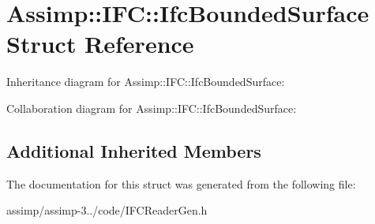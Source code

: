 \hypertarget{struct_assimp_1_1_i_f_c_1_1_ifc_bounded_surface}{\section{Assimp\+:\+:I\+F\+C\+:\+:Ifc\+Bounded\+Surface Struct Reference}
\label{struct_assimp_1_1_i_f_c_1_1_ifc_bounded_surface}
}


Inheritance diagram for Assimp\+:\+:I\+F\+C\+:\+:Ifc\+Bounded\+Surface\+:


Collaboration diagram for Assimp\+:\+:I\+F\+C\+:\+:Ifc\+Bounded\+Surface\+:
\subsection*{Additional Inherited Members}


The documentation for this struct was generated from the following file\+:\begin{DoxyCompactItemize}
\item 
assimp/assimp-\/3../code/I\+F\+C\+Reader\+Gen.\+h\end{DoxyCompactItemize}
